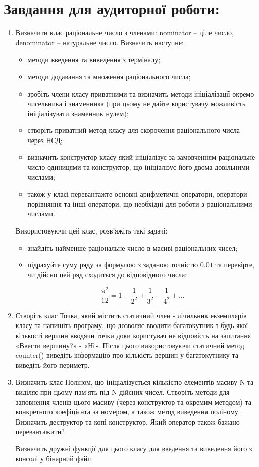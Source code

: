 \documentclass[a5paper,titlepage,openany,twoside,
]
{book_unv}%
\begin{document}
\section{Завдання для аудиторної роботи:}
\begin{enumerate}
\def\labelenumi{\arabic{enumi})}

\item 
Визначити клас раціональне число з членами: nominator -- ціле
число, denominator -- натуральне число. Визначить наступне:
\begin{itemize}
\item
методи введення та виведення з терміналу;
\item 
методи додавання та множення раціонального числа;
\item
зробіть члени класу приватними та визначить методи ініціалізації
окремо чисельника і знаменника (при цьому не дайте користувачу
можливість ініціалізувати знаменник нулем);
\item
створіть приватний метод класу для скорочення раціонального числа
через НСД;
\item визначить конструктор класу який ініціалізує за замовченням
раціональне число одиницями та конструктор, що ініціалізує його двома
довільними числами;
\item також у класі перевантажте основні арифметичні оператори, оператори
порівняння та інші оператори, що необхідні для роботи з раціональними
числами.
\end{itemize}

Використовуючи цей клас, розв'яжіть такі задачі:
\begin{itemize}
\item
знайдіть найменше раціональне число в масиві раціональних чисел;
\item
підрахуйте суму ряду за формулою з заданою точністю $0.01$ та
перевірте, чи дійсно цей ряд сходиться до відповідного числа:

\[\frac{\pi^{2}}{12} = 1 - \frac{1}{2^{2}} + \frac{1}{3^{2}} - \frac{1}{4^{2}} + \ldots\]

\end{itemize}

\item
  Створіть клас Точка, який містить статичний член - лічильник екземплярів класу
 та напишіть програму, що дозволяє вводити багатокутник з будь-якої кількості вершин вводячи точки доки
  користувач не відповість на запитання «Ввести вершину?» - «Ні». Після
  цього використовуючи статичний метод counter()
  виведіть інформацію про кількість вершин у багатокутнику та
  виведіть його периметр.
\item
  Визначить клас Поліном, що ініціалізується кількістю елементів масиву
  N та виділяє при цьому пам'ять під N дійсних чисел. Створіть методи
  для заповнення членів цього масиву (через конструктор та окремим
  методом) та конкретного коефіцієнта за номером, а також метод виведення
поліному. Визначить деструктор та копі-конструктор. Який оператор також 
бажано перевантажити?

  Визначить дружні функції для цього класу для введення та виведення
його з консолі у бінарний файл.


\end{enumerate}
\end{document}
